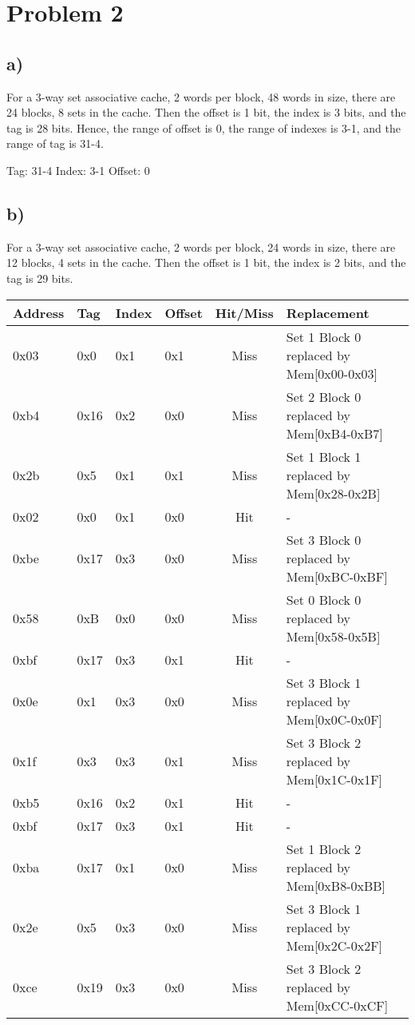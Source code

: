 \documentclass[a4paper,12pt]{article}
\begin{document}
\section*{Problem 2}

\subsection*{a)}

For a 3-way set associative cache, 2 words per block, 48 words in size, there are 24 blocks, 8 sets in the cache. 
Then the offset is 1 bit, the index is 3 bits, and the tag is 28 bits.
Hence, the range of offset is 0, the range of indexes is 3-1, and the range of tag is 31-4.

Tag: 31-4
Index: 3-1
Offset: 0

\subsection*{b)}

For a 3-way set associative cache, 2 words per block, 24 words in size, there are 12 blocks, 4 sets in the cache. 
Then the offset is 1 bit, the index is 2 bits, and the tag is 29 bits.

\begin{table}[H]
	\centering
	\begin{tabular}{llllcl}
		\toprule
		Address & Tag & Index & Offset & Hit/Miss & Replacement \\
		\midrule
		0x03 & 0x0 & 0x1 & 0x1 & Miss & Set 1 Block 0 replaced by Mem[0x00-0x03] \\
		0xb4 & 0x16 & 0x2 & 0x0 & Miss & Set 2 Block 0 replaced by Mem[0xB4-0xB7] \\
		0x2b & 0x5 & 0x1 & 0x1 & Miss & Set 1 Block 1 replaced by Mem[0x28-0x2B] \\
		0x02 & 0x0 & 0x1 & 0x0 & Hit & - \\
		0xbe & 0x17 & 0x3 & 0x0 & Miss & Set 3 Block 0 replaced by Mem[0xBC-0xBF] \\
		0x58 & 0xB & 0x0 & 0x0 & Miss & Set 0 Block 0 replaced by Mem[0x58-0x5B] \\
		0xbf & 0x17 & 0x3 & 0x1 & Hit & - \\
		0x0e & 0x1 & 0x3 & 0x0 & Miss & Set 3 Block 1 replaced by Mem[0x0C-0x0F] \\
		0x1f & 0x3 & 0x3 & 0x1 & Miss & Set 3 Block 2 replaced by Mem[0x1C-0x1F] \\
		0xb5 & 0x16 & 0x2 & 0x1 & Hit & - \\
		0xbf & 0x17 & 0x3 & 0x1 & Hit & - \\
		0xba & 0x17 & 0x1 & 0x0 & Miss & Set 1 Block 2 replaced by Mem[0xB8-0xBB] \\
		0x2e & 0x5 & 0x3 & 0x0 & Miss & Set 3 Block 1 replaced by Mem[0x2C-0x2F] \\
		0xce & 0x19 & 0x3 & 0x0 & Miss & Set 3 Block 2 replaced by Mem[0xCC-0xCF] \\
		\bottomrule
	\end{tabular}
\end{table}
\end{document}
